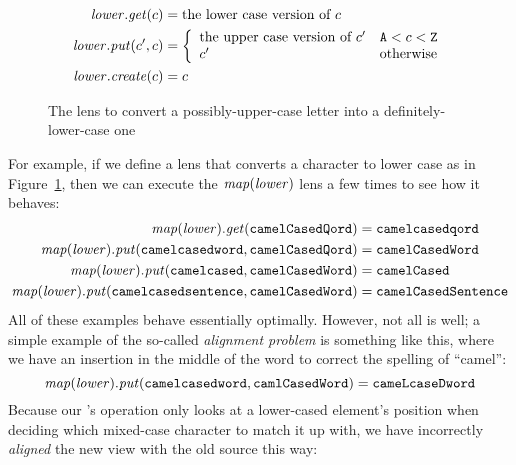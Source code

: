 \begin{figure}
    \begin{align*}
        \mathit{lower}.\mathit{get}(c) &= \mbox{the lower case version of $c$} \\
        \mathit{lower}.\mathit{put}(c',c) &= \left\{\begin{array}{ll}
            \mbox{the upper case version of $c'$} & \mathtt{A} < c < \mathtt{Z} \\
            c' & \mbox{otherwise}
        \end{array}\right. \\
        \mathit{lower}.\mathit{create}(c) &= c
    \end{align*}
    \caption{The \tolower lens to convert a possibly-upper-case letter into
    a definitely-lower-case one}
    \label{fig:tolower-lens}
\end{figure}
For example, if we define a lens \tolower that converts a character to lower
case as in Figure~\ref{fig:tolower-lens}, then we can execute the
$\mathit{map}(\mathit{lower})$ lens a few times to see how it behaves:
\begin{align*}
    \mathit{map}(\mathit{lower}).\mathit{get}(\mathtt{camelCasedQord})
        &= \mathtt{camelcasedqord} \\
    \mathit{map}(\mathit{lower}).\mathit{put}(\mathtt{camelcasedword},\mathtt{camelCasedQord})
        &= \mathtt{camelCasedWord} \\
    \mathit{map}(\mathit{lower}).\mathit{put}(\mathtt{camelcased},\mathtt{camelCasedWord})
        &= \mathtt{camelCased} \\
    \mathit{map}(\mathit{lower}).\mathit{put}(\mathtt{camelcasedsentence},\mathtt{camelCasedWord})
        &= \mathtt{camelCasedSentence}
\end{align*}
All of these examples behave essentially optimally. However, not all is
well; a simple example of the so-called \emph{alignment problem} is
something like this, where we have an insertion in the middle of the word to
correct the spelling of ``camel'':
\[\mathit{map}(\mathit{lower}).\mathit{put}(\mathtt{camelcasedword},\mathtt{camlCasedWord})
    = \mathtt{cameLcaseDword}\]
Because our \map's \PUT operation only looks at a lower-cased element's
position when deciding which mixed-case character to match it up with, we
have incorrectly \emph{aligned} the new view with the old source this way:


